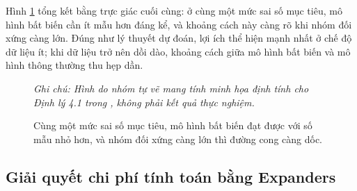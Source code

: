 Hình \ref{fig:error-curve} tổng kết bằng trực giác cuối cùng: ở cùng một mức sai số mục tiêu, mô hình bất biến cần ít mẫu hơn đáng kể, và khoảng cách này càng rõ khi nhóm đối xứng càng lớn. Đúng như lý thuyết dự đoán, lợi ích thể hiện mạnh nhất ở chế độ dữ liệu ít; khi dữ liệu trở nên dồi dào, khoảng cách giữa mô hình bất biến và mô hình thông thường thu hẹp dần.
 
\begin{figure}[H]
    \centering
    \caption{Cùng một mức sai số mục tiêu, mô hình bất biến đạt được với số mẫu nhỏ hơn, và nhóm đối xứng càng lớn thì đường cong càng dốc.}
    \label{fig:error-curve}
    \vspace{2mm}

    \textit{Ghi chú: Hình do nhóm tự vẽ mang tính minh họa định tính cho Định lý 4.1 trong \cite{tahmasebi2023exact}, không phải kết quả thực nghiệm.}
\end{figure}

\subsection{Giải quyết chi phí tính toán bằng Expanders}
\label{subsec:expanders}


